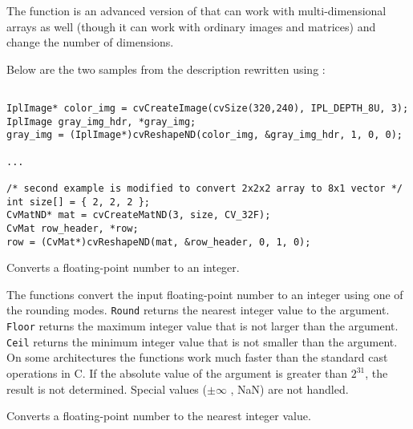 The function is an advanced version of  that can work with multi-dimensional arrays as well (though it can work with ordinary images and matrices) and change the number of dimensions.

\ifC
Below are the two samples from the  description rewritten using :

\begin{lstlisting}

IplImage* color_img = cvCreateImage(cvSize(320,240), IPL_DEPTH_8U, 3);
IplImage gray_img_hdr, *gray_img;
gray_img = (IplImage*)cvReshapeND(color_img, &gray_img_hdr, 1, 0, 0);

...

/* second example is modified to convert 2x2x2 array to 8x1 vector */
int size[] = { 2, 2, 2 };
CvMatND* mat = cvCreateMatND(3, size, CV_32F);
CvMat row_header, *row;
row = (CvMat*)cvReshapeND(mat, &row_header, 0, 1, 0);

\end{lstlisting}
\fi

\ifC
{}\label{cvRound}

Converts a floating-point number to an integer.


\begin{description}
\end{description}


The functions convert the input floating-point number to an integer using one of the rounding
modes. \texttt{Round} returns the nearest integer value to the
argument. \texttt{Floor} returns the maximum integer value that is not
larger than the argument. \texttt{Ceil} returns the minimum integer
value that is not smaller than the argument. On some architectures the
functions work much faster than the standard cast
operations in C. If the absolute value of the argument is greater than
$2^{31}$, the result is not determined. Special values ($\pm \infty$ , NaN)
are not handled.

\else


Converts a floating-point number to the nearest integer value.


